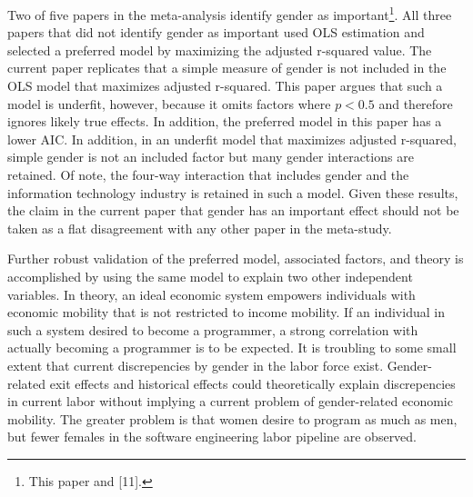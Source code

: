 \documentclass[review]{elsarticle}
\begin{document}
Two of five papers in the meta-analysis identify gender as important\footnote{
    This paper and [11].
}.
All three papers that did not identify gender as important used OLS estimation
and selected a preferred model by maximizing the adjusted r-squared value.
The current paper replicates that a simple measure of gender is not included in the OLS model
that maximizes adjusted r-squared.
This paper argues that such a model is underfit, however, because it omits
factors where $p < 0.5$ and therefore ignores likely true effects.
In addition, the preferred model in this paper has a lower AIC.
In addition, in an underfit model that maximizes adjusted r-squared,
simple gender is not an included factor but many gender interactions are retained.
Of note, the four-way interaction that includes gender and the information technology industry is retained
in such a model.
Given these results,
the claim in the current paper that gender has an important effect should not be taken as a
flat disagreement with any other paper in the meta-study.


Further robust validation of the preferred model, associated factors, and theory
is accomplished by using the same model to explain two other independent variables.
In theory, an ideal economic system empowers individuals with economic mobility that is not restricted to income mobility.
If an individual in such a system desired to become a programmer,
a strong correlation with actually becoming a programmer is to be expected.
It is troubling to some small extent that current discrepencies by gender in the labor force exist.
Gender-related exit effects and historical effects could theoretically explain discrepencies in current labor without implying
a current problem of gender-related economic mobility.
The greater problem is that women desire to program as much as men, but fewer females in the software engineering labor pipeline are observed.
\end{document}
